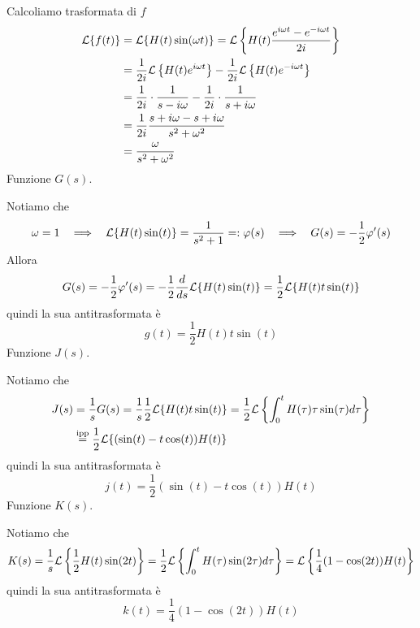 \Soluzione

Calcoliamo trasformata di $f$
\begin{align*}
\mathcal{L}\{f(t)\} & = \mathcal{L}\{H(t)\sin(\omega t)\} = \mathcal{L}\left\{H(t)\frac{e^{i\omega t} - e^{- i\omega t}}{2i}\right\}\\
 & = \frac{1}{2i}\mathcal{L}\left\{H(t) e^{i\omega t}\right\} - \frac{1}{2i}\mathcal{L}\left\{H(t) e^{- i\omega t}\right\}\\
 & = \frac{1}{2i} \cdot \frac{1}{s - i\omega} - \frac{1}{2i} \cdot \frac{1}{s + i\omega}\\
 & = \frac{1}{2i}\frac{s + i\omega - s + i\omega}{s^{2} + \omega^{2}}\\
 & = \frac{\omega}{s^{2} + \omega^{2}}
\end{align*}
Funzione $G(s)$.

Notiamo che
\begin{equation*}
\omega = 1\ \ \implies \ \ \Lc\{H(t)\sin(t)\} = \frac{1}{s^{2} + 1} = :\varphi (s) \ \ \implies \ \ G(s) = - \frac{1}{2} \varphi'(s)
\end{equation*}
Allora
\begin{equation*}
G(s) = - \frac{1}{2} \varphi'(s) = - \frac{1}{2}\frac{d}{ds}\mathcal{L}\{H(t)\sin(t)\} = \frac{1}{2}\mathcal{L}\{H(t) t\sin(t)\}
\end{equation*}
quindi la sua antitrasformata è
\begin{equation*}
g(t) = \frac{1}{2} H(t) t\sin(t)
\end{equation*}
Funzione $J(s)$.

Notiamo che
\begin{align*}
J(s) & = \frac{1}{s} G(s) = \frac{1}{s}\frac{1}{2}\mathcal{L}\{H(t) t\sin(t)\} = \frac{1}{2}\mathcal{L}\left\{\int^{t}_{0} H(\tau) \tau \sin(\tau) d\tau \right\}\\
 & \overset{\text{ipp}}{=}\frac{1}{2}\mathcal{L}\{(\sin(t) - t\cos(t)) H(t)\}
\end{align*}
quindi la sua antitrasformata è
\begin{equation*}
j(t) = \frac{1}{2}(\sin(t) - t\cos(t)) H(t)
\end{equation*}
Funzione $K(s)$.

Notiamo che
\begin{equation*}
K(s) = \frac{1}{s}\mathcal{L}\left\{\frac{1}{2}H(t)\sin(2t)\right\} = \frac{1}{2}\mathcal{L}\left\{\int^{t}_{0} H(\tau)\sin(2\tau) d\tau \right\} = \mathcal{L}\left\{\frac{1}{4}(1 - \cos(2t)) H(t)\right\}
\end{equation*}
quindi la sua antitrasformata è
\begin{equation*}
k(t) = \frac{1}{4}(1 - \cos(2t)) H(t)
\end{equation*}
